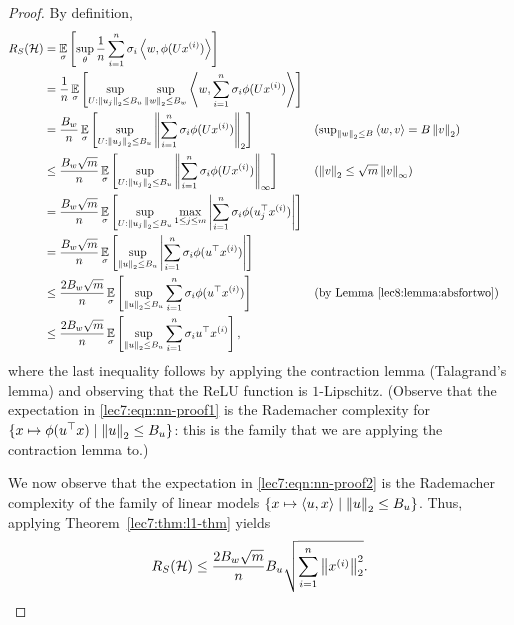 \begin{proof}
    By definition,
    \begin{align}
        R_S(\mathcal{H}) 
        &= \operatorname*{\mathbb{E}}_\sigma\left[ \sup_\theta \frac{1}{n} \sum_{i=1}^n \sigma_i \left\langle w,\phi(Ux^{(i)})\right\rangle \right]
        \\&= \frac{1}{n} \operatorname*{\mathbb{E}}_\sigma\left[ \sup_{U : \left\|u_j\right\|_2 \leq B_u} \sup_{\left\|w\right\|_2 \leq B_w} \left\langle w,\sum_{i=1}^n \sigma_i \phi(Ux^{(i)})\right\rangle \right]
        \\&= \frac{B_w}{n}\operatorname*{\mathbb{E}}_\sigma\left[ \sup_{U : \left\|u_j\right\|_2 \leq B_u} \left\| \sum_{i=1}^n \sigma_i \phi(Ux^{(i)})\right\|_2 \right]
            &&\text{($\textstyle\sup_{\left\|w\right\|_2\leq B}\left\langle w,v\right\rangle = B\left\|v\right\|_2$)}
        \\&\leq \frac{B_w\sqrt{m}}{n}\operatorname*{\mathbb{E}}_\sigma\left[ \sup_{U : \left\|u_j\right\|_2 \leq B_u} \left\| \sum_{i=1}^n \sigma_i \phi(Ux^{(i)})\right\|_\infty \right]
            &&\text{($\left\|v\right\|_2 \leq \sqrt{m}\left\|v\right\|_\infty$)}
        \\&= \frac{B_w\sqrt{m}}{n}\operatorname*{\mathbb{E}}_\sigma\left[ \sup_{U : \left\|u_j\right\|_2 \leq B_u} \max_{1\leq j\leq m} \left\lvert \sum_{i=1}^n \sigma_i \phi(u_j^\top x^{(i)})\right\rvert \right] 
        \\&= \frac{B_w\sqrt{m}}{n}\operatorname*{\mathbb{E}}_\sigma\left[ \sup_{\left\|u\right\|_2 \leq B_u} \left\lvert \sum_{i=1}^n \sigma_i \phi(u^\top x^{(i)})\right\rvert \right]
        \\&\leq \frac{2B_w\sqrt{m}}{n}\operatorname*{\mathbb{E}}_\sigma\left[ \sup_{\left\|u\right\|_2 \leq B_u} \sum_{i=1}^n \sigma_i \phi(u^\top x^{(i)}) \right]
            &&\text{(by Lemma \ref{lec8:lemma:absfortwo})} \label{lec7:eqn:nn-proof1}
        \\&\leq \frac{2B_w\sqrt{m}}{n}\operatorname*{\mathbb{E}}_\sigma\left[ \sup_{\left\|u\right\|_2 \leq B_u} \sum_{i=1}^n \sigma_i u^\top x^{(i)} \right], \label{lec7:eqn:nn-proof2}
    \end{align}
    where the last inequality follows by applying the contraction lemma (Talagrand's lemma) and observing that the ReLU function is $1$-Lipschitz. (Observe that the expectation in \eqref{lec7:eqn:nn-proof1} is the Rademacher complexity for $\{ x \mapsto \phi(u^\top x) \mid \left\|u\right\|_2 \leq B_u \}$: this is the family that we are applying the contraction lemma to.)
    
    We now observe that the expectation in \eqref{lec7:eqn:nn-proof2} is the Rademacher complexity of the family of linear models $\{x \mapsto \left\langle u,x\right\rangle \mid \left\|u\right\|_2\leq B_u\}$. Thus, applying Theorem~\ref{lec7:thm:l1-thm} yields
    \begin{equation}
        R_S(\mathcal{H}) \leq \frac{2B_w\sqrt{m}}{n}B_u\sqrt{\sum_{i=1}^n \left\|x^{(i)}\right\|_2^2}.
    \end{equation}
    

\end{proof}
